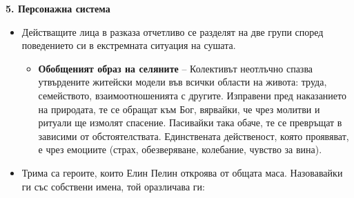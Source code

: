 \documentclass[12pt,a4paper]{article}
\begin{document}
\vspace{-0.2cm}
\noindent
\textbf{5. Персонажна система} 
\begin{itemize}[leftmargin=*, noitemsep, topsep=2pt, parsep=0pt] 
    \item Действащите лица в разказа отчетливо се разделят на две групи според поведението си в екстремната ситуация на сушата. 
    \begin{itemize}[leftmargin=*]
        \item \textbf{Обобщеният образ на селяните} -- Колективът неотлъчно спазва утвърдените житейски модели във всички области на живота: труда, семейството, взаимоотношенията с другите. Изправени пред наказанието на природата, те се обращат към Бог, вярвайки, че чрез молитви и ритуали ще измолят спасение. Пасивайки така обаче, те се превръщат в зависими от обстоятелствата. Единствената действеност, която проявяват, е чрез емоциите (страх, обезверяване, колебание, чувство за вина).
    \end{itemize} 
    \item Трима са героите, които Елин Пелин откроява от общата маса. Назовавайки ги със собствени имена, той оразличава ги:
\end{itemize}
\end{document}
